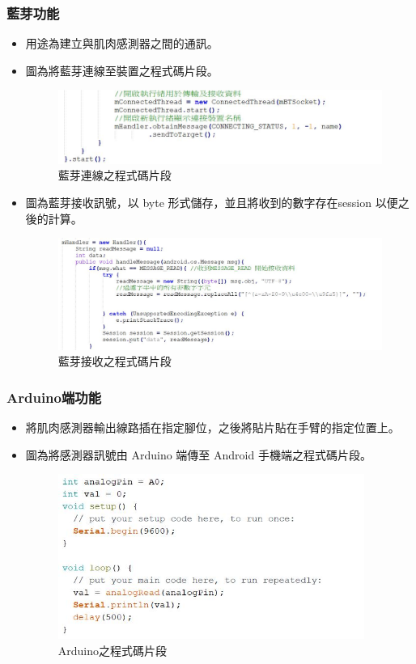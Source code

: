 \documentclass[12pt]{article}  %
\theoremstyle{plain}
\begin{document}
\subsubsection{藍芽功能}
\begin{itemize}
\item 用途為建立與肌肉感測器之間的通訊。
\item 圖為將藍芽連線至裝置之程式碼片段。
\begin{figure}[h]  %
\centering
\includegraphics[width=15cm]{pic/ch2/code-BluetoothActivity.JPG}
\caption{藍芽連線之程式碼片段}
\end{figure}

\item 圖為藍芽接收訊號，以 byte 形式儲存，並且將收到的數字存在session 以便之後的計算。
\begin{figure}[h]  %
\centering
\includegraphics[width=15cm]{pic/ch2/code-BluetoothActivity2.JPG}
\caption{藍芽接收之程式碼片段}
\end{figure}
\end{itemize}
\newpage

\subsubsection{Arduino端功能}
\begin{itemize}
\item 將肌肉感測器輸出線路插在指定腳位，之後將貼片貼在手臂的指定位置上。
\item 圖為將感測器訊號由 Arduino 端傳至 Android 手機端之程式碼片段。
\begin{figure}[h]  %
\centering
\includegraphics[width=10cm]{pic/ch2/code-Arduino.JPG}
\caption{Arduino之程式碼片段}
\end{figure}
\end{itemize}
\newpage
\end{document}
